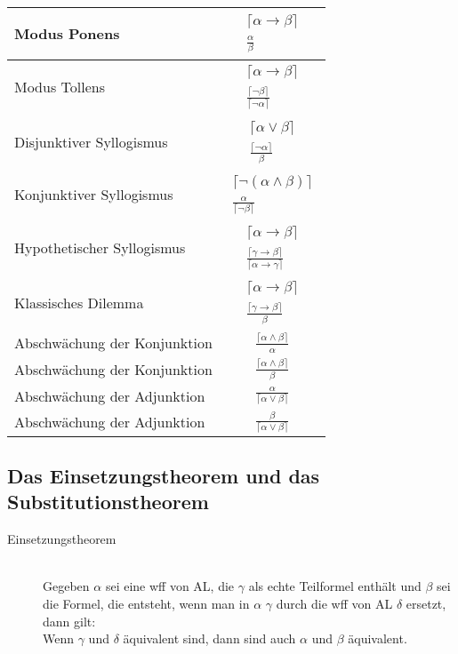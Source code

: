 \documentclass{scrartcl}
\begin{document}
\Huge
\begin{tabularx}{\linewidth}{l c}
	Modus Ponens & $ \substack{\lceil \alpha \rightarrow \beta \rceil \\ \frac{\alpha}{\beta}}  $ \\
	\hline
	Modus Tollens & $ \substack{\lceil \alpha \rightarrow \beta \rceil \\ \frac{\lceil \neg \beta \rceil}{\lceil \neg \alpha \rceil}} $ \\
	\hline
	Disjunktiver Syllogismus & $ \substack{\lceil \alpha \vee \beta \rceil \\ \frac{\lceil \neg \alpha \rceil}{\beta}} $ \\
	\hline
	Konjunktiver Syllogismus & $ \substack{\lceil \neg (\alpha \wedge \beta) \rceil \\ \frac{\alpha}{\lceil \neg \beta \rceil}} $ \\
	\hline
	Hypothetischer Syllogismus & $ \substack{\lceil \alpha \rightarrow \beta \rceil \\ \frac{\lceil \gamma \rightarrow \beta \rceil}{\lceil \alpha \rightarrow \gamma \rceil}} $ \\
	\hline
	Klassisches Dilemma & $ \substack{\lceil \alpha \rightarrow \beta \rceil \\ \frac{\lceil \gamma \rightarrow \beta \rceil}{\beta}} $ \\
	\hline
	Abschwächung der Konjunktion & $ \frac{\lceil \alpha \wedge \beta \rceil}{\alpha} $ \\
	\hline
	Abschwächung der Konjunktion & $ \frac{\lceil \alpha \wedge \beta \rceil}{\beta} $ \\
	\hline
	Abschwächung der Adjunktion & $ \frac{\alpha}{\lceil \alpha \vee \beta \rceil} $ \\
	\hline
	Abschwächung der Adjunktion & $ \frac{\beta}{\lceil \alpha \vee \beta \rceil} $
\end{tabularx}

\normalsize
\subsection{Das Einsetzungstheorem und das Substitutionstheorem}

\begin{description}
	\item[Einsetzungstheorem] \mbox{}\\ Gegeben $ \alpha $ sei eine wff von AL, die $ \gamma $ als echte Teilformel enthält und $ \beta $ sei die Formel, die entsteht, wenn man in $ \alpha $ $ \gamma $ durch die wff von AL $ \delta $ ersetzt, dann gilt: \\
	Wenn $ \gamma $ und $ \delta $ äquivalent sind, dann sind auch $ \alpha $ und $ \beta $ äquivalent.
\end{description}
\end{document}
